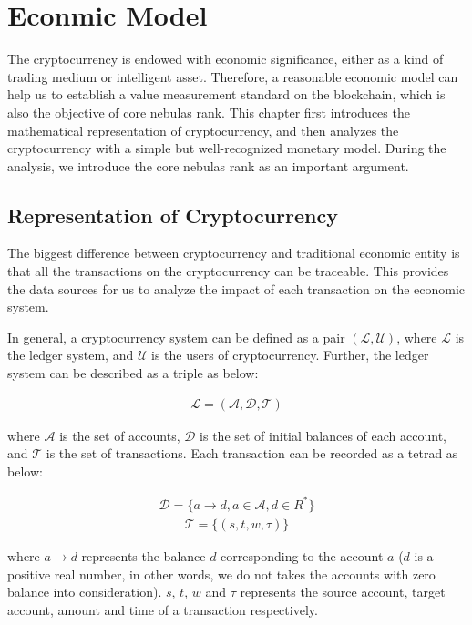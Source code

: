 \section{Econmic Model}
The cryptocurrency is endowed with economic significance, either as a kind of trading medium or intelligent asset. Therefore, a reasonable economic model can help us to establish a value measurement standard on the blockchain, which is also the objective of core nebulas rank. This chapter first introduces the mathematical representation of cryptocurrency, and then analyzes the cryptocurrency with a simple but well-recognized monetary model. During the analysis, we introduce the core nebulas rank as an important argument.

\subsection{Representation of Cryptocurrency}
The biggest difference between cryptocurrency and traditional economic entity is that all the transactions on the cryptocurrency can be traceable. This provides the data sources for us to analyze the impact of each transaction on the economic system.

In general, a cryptocurrency system can be defined as a pair $(\mathcal{L}, \mathcal{U})$, where $\mathcal{L}$ is the ledger system, and $\mathcal{U}$ is the users of cryptocurrency. Further, the ledger system can be described as a triple as below:

\begin{align}
\mathcal{L} = (\mathcal{A}, \mathcal{D}, \mathcal{T})
\end{align}

\noindent where $\mathcal{A}$ is the set of accounts, $\mathcal{D}$ is the set of initial balances of each account, and $\mathcal{T}$ is the set of transactions. Each transaction can be recorded as a tetrad as below:

\begin{align}
\mathcal{D} = \{a \rightarrow d, a{\in}\mathcal{A}, d{\in}R^*\}
\end{align}
\begin{align}
\mathcal{T} = \{(s, t, w, \tau)\}
\end{align}

\noindent where $a \rightarrow d$ represents the balance $d$ corresponding to the account $a$ ($d$ is a positive real number, in other words, we do not takes the accounts with zero balance into consideration). $s$, $t$, $w$ and $\tau$ represents the source account, target account, amount and time of a transaction respectively.

